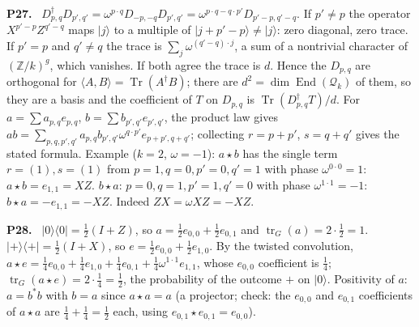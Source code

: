 \documentclass[11pt]{article}
\newcommand{\Z}{\mathbb{Z}}
\newcommand{\Tr}{\operatorname{Tr}}
\newenvironment{solution}[1]{\medskip\noindent\textbf{P#1.}\ }{\par\medskip}
\begin{document}
\begin{solution}{27}
$D_{p,q}^\dagger D_{p',q'} = \omega^{p\cdot q}D_{-p,-q}D_{p',q'} = \omega^{p\cdot q-q\cdot p'}D_{p'-p,q'-q}$.
If $p'\ne p$ the operator $X^{p'-p}Z^{q'-q}$ maps $|j\rangle$ to a multiple of
$|j+p'-p\rangle\ne|j\rangle$: zero diagonal, zero trace. If $p' = p$ and
$q'\ne q$ the trace is $\sum_j\omega^{(q'-q)\cdot j}$, a sum of a nontrivial
character of $(\Z/k)^g$, which vanishes. If both agree the trace is $d$. Hence
the $D_{p,q}$ are orthogonal for $\langle A,B\rangle = \Tr(A^\dagger B)$; there
are $d^2 = \dim\operatorname{End}(\mathcal Q_k)$ of them, so they are a basis
and the coefficient of $T$ on $D_{p,q}$ is $\Tr(D_{p,q}^\dagger T)/d$. For
$a = \sum a_{p,q}e_{p,q}$, $b = \sum b_{p',q'}e_{p',q'}$, the product law gives
$ab = \sum_{p,q,p',q'}a_{p,q}b_{p',q'}\omega^{q\cdot p'}e_{p+p',q+q'}$; collecting
$r = p+p'$, $s = q+q'$ gives the stated formula. Example ($k = 2$, $\omega = -1$):
$a\star b$ has the single term $r = (1), s = (1)$ from $p = 1,q = 0,p' = 0,q' = 1$
with phase $\omega^{0\cdot0} = 1$: $a\star b = e_{1,1} = XZ$. $b\star a$: $p = 0,q = 1,p' = 1,q' = 0$
with phase $\omega^{1\cdot1} = -1$: $b\star a = -e_{1,1} = -XZ$. Indeed
$ZX = \omega XZ = -XZ$.
\end{solution}

\begin{solution}{28}
$|0\rangle\langle0| = \tfrac12(I+Z)$, so $a = \tfrac12e_{0,0}+\tfrac12e_{0,1}$ and
$\operatorname{tr}_G(a) = 2\cdot\tfrac12 = 1$. $|+\rangle\langle+| = \tfrac12(I+X)$, so
$e = \tfrac12e_{0,0}+\tfrac12e_{1,0}$. By the twisted convolution,
$a\star e = \tfrac14e_{0,0}+\tfrac14e_{1,0}+\tfrac14e_{0,1}+\tfrac14\omega^{1\cdot1}e_{1,1}$,
whose $e_{0,0}$ coefficient is $\tfrac14$; $\operatorname{tr}_G(a\star e) = 2\cdot\tfrac14 = \tfrac12$,
the probability of the outcome $+$ on $|0\rangle$. Positivity of $a$: $a = b^*b$
with $b = a$ since $a\star a = a$ (a projector; check: the $e_{0,0}$ and $e_{0,1}$
coefficients of $a\star a$ are $\tfrac14+\tfrac14 = \tfrac12$ each, using
$e_{0,1}\star e_{0,1} = e_{0,0}$).
\end{solution}
\end{document}
